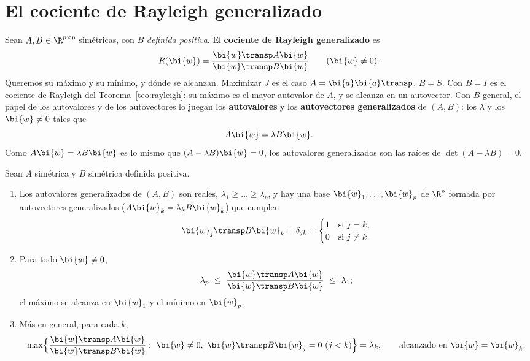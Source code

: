 \section{El cociente de Rayleigh generalizado}\label{lda-sec:rayleigh}

Sean $A,B\in\R^{p\times p}$ simétricas, con $B$ \emph{definida positiva}. El
\textbf{cociente de Rayleigh generalizado} es
\[
R(\bi{w})=\frac{\bi{w}\transp A\bi{w}}{\bi{w}\transp B\bi{w}}\qquad(\bi{w}\ne0).
\]
Queremos su máximo y su mínimo, y dónde se alcanzan. Maximizar $J$ es el caso
$A=\bi{a}\bi{a}\transp$, $B=S$. Con $B=I$ es el cociente de Rayleigh del Teorema~\ref{teo:rayleigh}: su máximo es el mayor autovalor de $A$, y se alcanza en un autovector.
Con $B$ general, el papel de los autovalores y de los autovectores lo juegan
los \textbf{autovalores} y los \textbf{autovectores generalizados} de $(A,B)$:
los $\lambda$ y los $\bi{w}\ne0$ tales que
\[
A\bi{w}=\lambda B\bi{w} .
\]
Como $A\bi{w}=\lambda B\bi{w}$ es lo mismo que $(A-\lambda B)\bi{w}=0$, los autovalores
generalizados son las raíces de $\det(A-\lambda B)=0$.

\begin{theorem}\label{lda-teo:rayleigh}
Sean $A$ simétrica y $B$ simétrica definida positiva.
\begin{enumerate}[label=(\alph*),leftmargin=*]
\item Los autovalores generalizados de $(A,B)$ son reales,
$\lambda_1\ge\dots\ge\lambda_p$, y hay una base $\bi{w}_1,\dots,\bi{w}_p$ de $\R^p$
formada por autovectores generalizados ($A\bi{w}_k=\lambda_kB\bi{w}_k$) que cumplen
\[
\bi{w}_j\transp B\bi{w}_k=\delta_{jk}=\begin{cases}1&\text{si }j=k,\\ 0&\text{si }j\ne k.\end{cases}
\]
\item Para todo $\bi{w}\ne0$,
\[
\lambda_p\ \le\ \frac{\bi{w}\transp A\bi{w}}{\bi{w}\transp B\bi{w}}\ \le\ \lambda_1 ;
\]
el máximo se alcanza en $\bi{w}_1$ y el mínimo en $\bi{w}_p$.
\item Más en general, para cada $k$,
\[
\max\Bigl\{\frac{\bi{w}\transp A\bi{w}}{\bi{w}\transp B\bi{w}}:\ \bi{w}\ne0,\ \bi{w}\transp B\bi{w}_j=0\ (j<k)\Bigr\}=\lambda_k ,
\qquad\text{alcanzado en } \bi{w}=\bi{w}_k .
\]
\end{enumerate}
\end{theorem}

